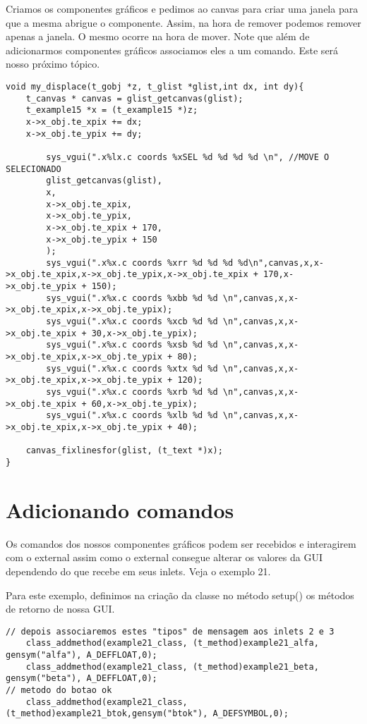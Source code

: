 Criamos os componentes gráficos e pedimos ao canvas para criar uma janela para que a mesma abrigue o componente.
Assim, na hora de remover podemos remover apenas a janela. O mesmo ocorre na hora de mover.
Note que além de adicionarmos componentes gráficos associamos eles a um comando. Este será nosso próximo tópico.

\begin{lstlisting}
void my_displace(t_gobj *z, t_glist *glist,int dx, int dy){
	t_canvas * canvas = glist_getcanvas(glist);
	t_example15 *x = (t_example15 *)z;
	x->x_obj.te_xpix += dx;
	x->x_obj.te_ypix += dy;

        sys_vgui(".x%lx.c coords %xSEL %d %d %d %d \n", //MOVE O SELECIONADO
		glist_getcanvas(glist),
		x,
		x->x_obj.te_xpix,
		x->x_obj.te_ypix,
		x->x_obj.te_xpix + 170,
		x->x_obj.te_ypix + 150
		);
        sys_vgui(".x%x.c coords %xrr %d %d %d %d\n",canvas,x,x->x_obj.te_xpix,x->x_obj.te_ypix,x->x_obj.te_xpix + 170,x->x_obj.te_ypix + 150);
        sys_vgui(".x%x.c coords %xbb %d %d \n",canvas,x,x->x_obj.te_xpix,x->x_obj.te_ypix);
        sys_vgui(".x%x.c coords %xcb %d %d \n",canvas,x,x->x_obj.te_xpix + 30,x->x_obj.te_ypix);
        sys_vgui(".x%x.c coords %xsb %d %d \n",canvas,x,x->x_obj.te_xpix,x->x_obj.te_ypix + 80);
        sys_vgui(".x%x.c coords %xtx %d %d \n",canvas,x,x->x_obj.te_xpix,x->x_obj.te_ypix + 120);
        sys_vgui(".x%x.c coords %xrb %d %d \n",canvas,x,x->x_obj.te_xpix + 60,x->x_obj.te_ypix);
        sys_vgui(".x%x.c coords %xlb %d %d \n",canvas,x,x->x_obj.te_xpix,x->x_obj.te_ypix + 40);

	canvas_fixlinesfor(glist, (t_text *)x);
}
\end{lstlisting}

\section{Adicionando comandos}

Os comandos dos nossos componentes gráficos podem ser recebidos e interagirem com o external assim como o
external consegue alterar os valores da GUI dependendo do que recebe em seus inlets. Veja o exemplo 21.

Para este exemplo, definimos na criação da classe no método setup() os métodos de retorno de nossa GUI.

\begin{lstlisting}
// depois associaremos estes "tipos" de mensagem aos inlets 2 e 3
    class_addmethod(example21_class, (t_method)example21_alfa,  gensym("alfa"), A_DEFFLOAT,0); 
    class_addmethod(example21_class, (t_method)example21_beta,  gensym("beta"), A_DEFFLOAT,0); 
// metodo do botao ok
    class_addmethod(example21_class, (t_method)example21_btok,gensym("btok"), A_DEFSYMBOL,0); 
\end{lstlisting}


